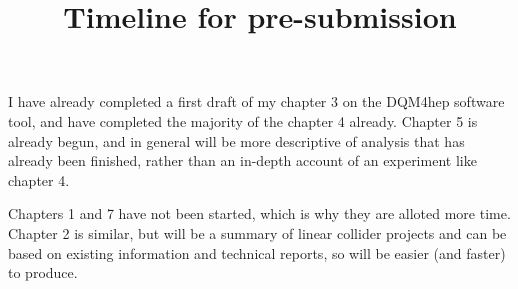 \documentclass{article}
\title{Timeline for pre-submission}
\date{}
\begin{document}
\maketitle

\vspace{-1.5cm}

I have already completed a first draft of my chapter 3 on the DQM4hep software tool, and have completed the majority of the chapter 4 already. Chapter 5 is already begun, and in general will be more descriptive of analysis that has already been finished, rather than an in-depth account of an experiment like chapter 4. 

Chapters 1 and 7 have not been started, which is why they are alloted more time. Chapter 2 is similar, but will be a summary of linear collider projects and can be based on existing information and technical reports, so will be easier (and faster) to produce. 

\vspace{0.5cm}

\begin{figure}[H]
\centering
{}
\end{figure}
\end{document}
